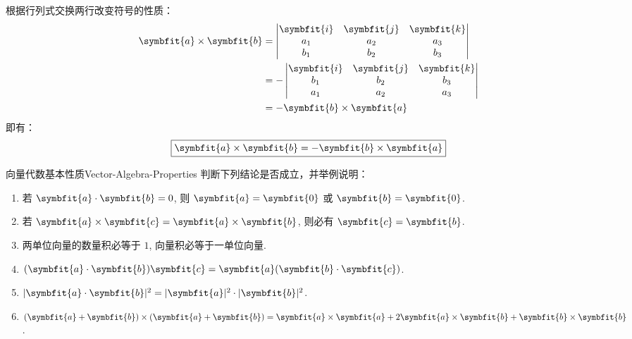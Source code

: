 \begin{myproof}

    根据行列式交换两行改变符号的性质：
    \begin{equation*}
        \begin{aligned}
            \symbfit{a} \times \symbfit{b} & = \begin{vmatrix} \symbfit{i} & \symbfit{j} & \symbfit{k} \\ a_1 & a_2 & a_3 \\ b_1 & b_2 & b_3 \end{vmatrix}   \\
                                           & = - \begin{vmatrix} \symbfit{i} & \symbfit{j} & \symbfit{k} \\ b_1 & b_2 & b_3 \\ a_1 & a_2 & a_3 \end{vmatrix} \\
                                           & = -\symbfit{b} \times \symbfit{a}
        \end{aligned}
    \end{equation*}
    即有：
    \begin{equation*}
        \boxed{\symbfit{a} \times \symbfit{b} = -\symbfit{b} \times \symbfit{a}}
    \end{equation*}
\end{myproof}


\begin{problem}{向量代数基本性质}{Vector-Algebra-Properties}
    判断下列结论是否成立，并举例说明：
    \begin{enumerate}
        \item 若 $\symbfit{a} \cdot \symbfit{b} = 0$, 则 $\symbfit{a} = \symbfit{0}$ 或 $\symbfit{b} = \symbfit{0}$.
        \item 若 $\symbfit{a} \times \symbfit{c} = \symbfit{a} \times \symbfit{b}$, 则必有 $\symbfit{c} = \symbfit{b}$.
        \item 两单位向量的数量积必等于 $1$, 向量积必等于一单位向量.
        \item $(\symbfit{a} \cdot \symbfit{b})\symbfit{c} = \symbfit{a}(\symbfit{b} \cdot \symbfit{c})$.
        \item $|\symbfit{a} \cdot \symbfit{b}|^2 = |\symbfit{a}|^2 \cdot |\symbfit{b}|^2$.
        \item $(\symbfit{a} + \symbfit{b}) \times (\symbfit{a} + \symbfit{b}) = \symbfit{a} \times \symbfit{a} + 2\symbfit{a} \times \symbfit{b} + \symbfit{b} \times \symbfit{b}$.
    \end{enumerate}
\end{problem}

